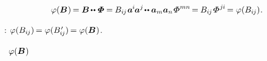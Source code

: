 \nopagebreak\vspace{-0.2em}\begin{equation*}
\varphi(\bm{B}\hspace{.1ex}) \hspace{-0.2ex}
= \bm{B} \hspace{-0.2ex} \dotdotp \hspace{-0.28ex} \scalebox{1.1}[1]{$\bm{\mathit{\Phi}}$} \hspace{-0.1ex}
= \hspace{-0.1ex} \somebivalenttensorcomponents{i\hspace{-0.1ex}j} \hspace{.16ex} \bm{a}^{\hspace{-0.1ex}i} \hspace{-0.16ex} \bm{a}^j \hspace{-0.3ex} \dotdotp \bm{a}_m \bm{a}_n \hspace{-0.2ex} \scalebox{1.2}[1]{$\mathit{\Phi}$}^{mn} \hspace{-0.25ex}
= \hspace{-0.1ex} \somebivalenttensorcomponents{i\hspace{-0.1ex}j} \hspace{-0.15ex} \scalebox{1.2}[1]{$\mathit{\Phi}$}^{\hspace{.1ex}j\hspace{-0.06ex}i} \hspace{-0.25ex}
= \varphi(\somebivalenttensorcomponents{i\hspace{-0.1ex}j})
\hspace{.1ex} .
\end{equation*}

\vspace{-0.25em} \noindent
{}   :
${\varphi(B_{i\hspace{-0.1ex}j}) \hspace{-0.2ex} = \varphi(B\hspace{.16ex}'_{\hspace{-0.32ex}i\hspace{-0.1ex}j}) \hspace{-0.2ex} = \varphi(\bm{B}\hspace{.1ex})}$.

~${\varphi(\bm{B}\hspace{.1ex})}$ 

